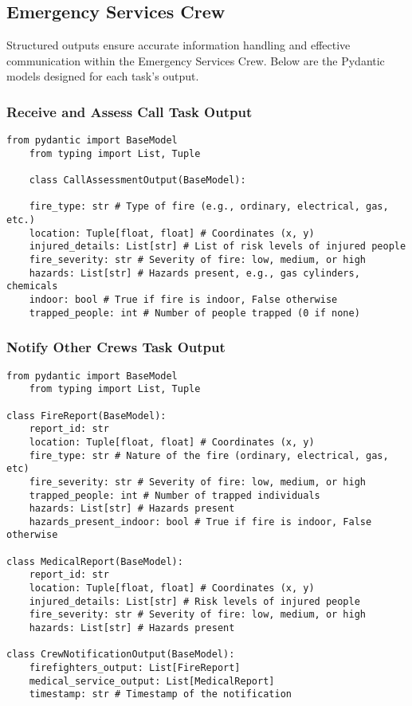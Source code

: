 \subsection{Emergency Services Crew}

Structured outputs ensure accurate information handling and effective communication within the Emergency Services Crew. Below 
are the Pydantic models designed for each task's output.

\subsubsection{Receive and Assess Call Task Output}

\begin{lstlisting}[caption={Pydantic model for Receive and Assess Call Task Output}] 
    from pydantic import BaseModel
    from typing import List, Tuple

    class CallAssessmentOutput(BaseModel): 

    fire_type: str # Type of fire (e.g., ordinary, electrical, gas, etc.) 
    location: Tuple[float, float] # Coordinates (x, y) 
    injured_details: List[str] # List of risk levels of injured people 
    fire_severity: str # Severity of fire: low, medium, or high 
    hazards: List[str] # Hazards present, e.g., gas cylinders, chemicals 
    indoor: bool # True if fire is indoor, False otherwise 
    trapped_people: int # Number of people trapped (0 if none) \end{lstlisting}

\subsubsection{Notify Other Crews Task Output}

\begin{lstlisting}[caption={Pydantic model for Notify Other Crews Task Output}] 
    from pydantic import BaseModel 
    from typing import List, Tuple

class FireReport(BaseModel): 
    report_id: str
    location: Tuple[float, float] # Coordinates (x, y) 
    fire_type: str # Nature of the fire (ordinary, electrical, gas, etc)
    fire_severity: str # Severity of fire: low, medium, or high
    trapped_people: int # Number of trapped individuals 
    hazards: List[str] # Hazards present
    hazards_present_indoor: bool # True if fire is indoor, False otherwise

class MedicalReport(BaseModel): 
    report_id: str
    location: Tuple[float, float] # Coordinates (x, y) 
    injured_details: List[str] # Risk levels of injured people 
    fire_severity: str # Severity of fire: low, medium, or high 
    hazards: List[str] # Hazards present

class CrewNotificationOutput(BaseModel): 
    firefighters_output: List[FireReport]
    medical_service_output: List[MedicalReport]
    timestamp: str # Timestamp of the notification \end{lstlisting}

